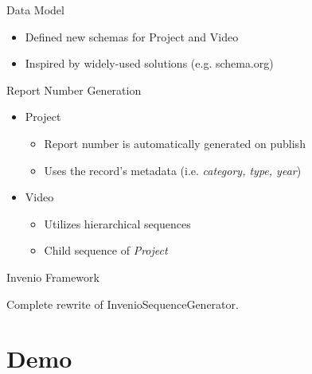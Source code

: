 \documentclass{beamer}
\newcommand{\contrib}[1]{
  \vfill
  \begin{alertblock}{Invenio Framework}
    #1
  \end{alertblock}
}
\begin{document}
  	\begin{frame}{Data Model}
    	\begin{itemize}
    	  \item{Defined new schemas for \alert{Project} and \alert{Video}}
   	  \item{Inspired by widely-used solutions (e.g. schema.org)}
	  \end{itemize}
	\end{frame}
	
	\begin{frame}{Report Number Generation}
	  \begin{itemize}	  
    	  \item{\alert{Project}}
      	\begin{itemize}
      	  \item{Report number is automatically generated on publish}
      	  \item{Uses the record's metadata (i.e. \emph{category, type, year})}
    	  \end{itemize}
    	  \item{\alert{Video}}
      	\begin{itemize}
      	  \item{Utilizes hierarchical sequences}
      	  \item{Child sequence of \emph{Project}}
    	  \end{itemize}
  	  \end{itemize}

  	   \contrib{
		  Complete rewrite of \alert{InvenioSequenceGenerator}.
		}    	
	\end{frame}
	
	\section{Demo}
\end{document}
